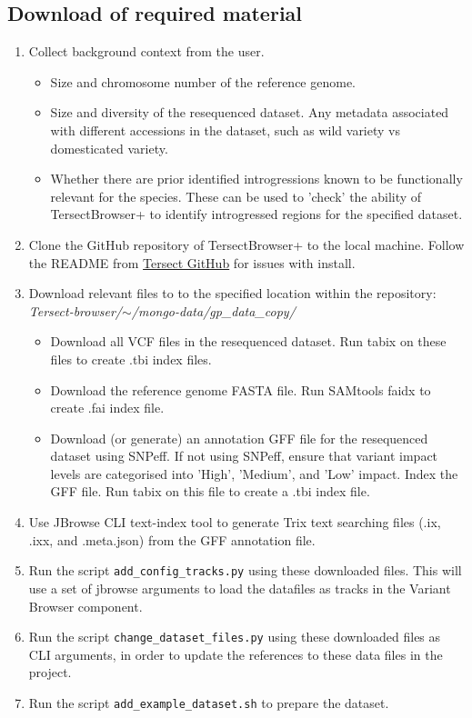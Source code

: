 \documentclass[12pt]{article}
\begin{document}
\subsection{Download of required material}
\begin{enumerate}
    \item Collect background context from the user.
\begin{itemize}
    \item Size and chromosome number of the reference genome.
    \item Size and diversity of the resequenced dataset. Any metadata associated with different accessions in the dataset, such as wild variety vs domesticated variety.
    \item Whether there are prior identified introgressions known to be functionally relevant for the species. These can be used to 'check' the ability of TersectBrowser+ to identify introgressed regions for the specified dataset.
\end{itemize}
    \item Clone the GitHub repository of TersectBrowser+ to the local machine. Follow the README from \hyperlink {https://github.com/Tersect-Browser/Tersect-browser.git}{Tersect GitHub} for issues with install.
    \item Download relevant files to to the specified location within the repository: \textit{Tersect-browser/\(\sim \)/mongo-data/gp\_data\_copy/}
    \begin{itemize}
        \item Download all VCF files in the resequenced dataset. Run tabix on these files to create .tbi index files.
        \item Download the reference genome FASTA file. Run SAMtools faidx to create .fai index file.
        \item Download (or generate) an annotation GFF file for the resequenced dataset using SNPeff. If not using SNPeff, ensure that variant impact levels are categorised into 'High', 'Medium', and 'Low' impact. Index the GFF file. Run tabix on this file to create a .tbi index file.
    \end{itemize}
    \item Use JBrowse CLI text-index tool to generate Trix text searching files (.ix, .ixx, and .meta.json) from the GFF annotation file.
    \item Run the script \verb+add_config_tracks.py+ using these downloaded files. This will use a set of jbrowse arguments to load the datafiles as tracks in the Variant Browser component.
    \item Run the script \verb+change_dataset_files.py+ using these downloaded files as CLI arguments, in order to update the references to these data files in the project.
    \item Run the script \verb+add_example_dataset.sh+ to prepare the dataset.
\end{enumerate}
\end{document}
